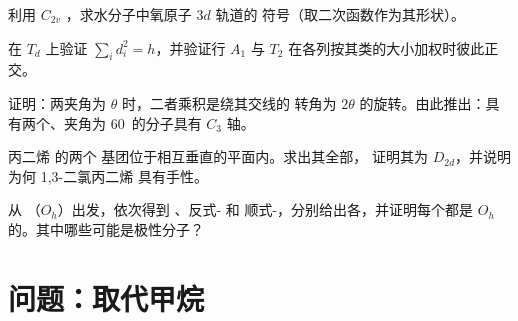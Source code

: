 \begin{exercise}[$\star\star$]\label{exo:b3:point-groups:8}
利用 $C_{2v}$ ，求水分子中氧原子 $3d$ 轨道的
符号（取二次函数作为其形状）。
\end{exercise}

\begin{exercise}[$\star\star$]\label{exo:b3:point-groups:9}
在 $T_d$ 上验证 $\sum_id_i^2 = h$，并验证行 $A_1$ 与 $T_2$
在各列按其类的大小加权时彼此正交。
\end{exercise}

\begin{exercise}[$\star\star\star$]\label{exo:b3:point-groups:10}
证明：两夹角为 $\theta$ 时，二者乘积是绕其交线的
转角为 $2\theta$ 的旋转。由此推出：具有两个、夹角为
60\textdegree\ 的分子具有 $C_3$ 轴。
\end{exercise}

\begin{exercise}[$\star\star\star$]\label{exo:b3:point-groups:11}
丙二烯  的两个  基团位于相互垂直的平面内。求出其全部，
证明其为 $D_{2d}$，并说明为何
1,3-二氯丙二烯  具有手性。
\end{exercise}

\begin{exercise}[$\star\star\star$]\label{exo:b3:point-groups:12}
从 （$O_h$）出发，依次得到 、反式- 和
顺式-，分别给出各，并证明每个都是
$O_h$ 的。其中哪些可能是极性分子？
\end{exercise}

\section{问题：取代甲烷}

